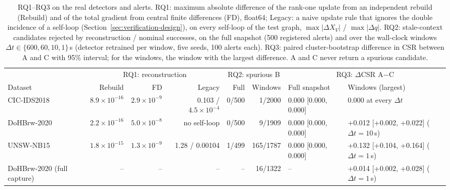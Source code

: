 \begin{table}[t]
\centering\footnotesize
\caption{RQ1--RQ3 on the real detectors and alerts. RQ1: maximum absolute difference of the rank-one update from an independent rebuild (Rebuild) and of the total gradient from central finite differences (FD), float64; Legacy: a naive update rule that ignores the double incidence of a self-loop (Section~\ref{sec:verification-design}), on every self-loop of the test graph, $\max|\Delta X_V|$ / $\max|\Delta q|$. RQ2: stale-context candidates rejected by reconstruction / nominal successes, on the full snapshot (500 registered alerts) and over the wall-clock windows $\Delta t\in\{600,60,10,1\}$\,s (detector retrained per window, five seeds, 100 alerts each). RQ3: paired cluster-bootstrap difference in CSR between A and C with 95\% interval; for the windows, the window with the largest difference. A and C never return a spurious candidate.}
\label{tab:main}
\begin{tabular}{@{}lrrrrrll@{}}
\toprule
& \multicolumn{3}{c}{RQ1: reconstruction} & \multicolumn{2}{c}{RQ2: spurious B} & \multicolumn{2}{c}{RQ3: $\Delta$CSR A$-$C} \\
\cmidrule(lr){2-4}\cmidrule(lr){5-6}\cmidrule(l){7-8}
Dataset & Rebuild & FD & Legacy & Full & Windows & Full snapshot & Windows (largest) \\
\midrule
CIC-IDS2018 & $8.9\times10^{-16}$ & $2.9\times10^{-9}$ & 0.103 / $4.5\times10^{-4}$ & 0/500 & 1/2000 & 0.000 [0.000, 0.000] & 0.000 at every $\Delta t$ \\
DoHBrw-2020 & $2.2\times10^{-16}$ & $5.0\times10^{-8}$ & no self-loop & 0/500 & 9/1909 & 0.000 [0.000, 0.000] & +0.012 [+0.002, +0.022] ($\Delta t{=}10$\,s) \\
UNSW-NB15 & $1.8\times10^{-15}$ & $1.3\times10^{-9}$ & 1.28 / 0.00104 & 1/499 & 165/1787 & 0.000 [0.000, 0.000] & +0.132 [+0.104, +0.164] ($\Delta t{=}1$\,s) \\
DoHBrw-2020 (full capture) & -- & -- & -- & -- & 16/1322 & -- & +0.014 [+0.002, +0.028] ($\Delta t{=}1$\,s) \\
\bottomrule
\end{tabular}
\end{table}
